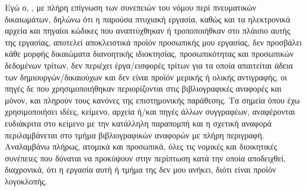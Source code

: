 \documentclass[
11pt, %
english, %
singlespacing, %
headsepline, %
]{MastersDoctoralThesis} %
\begin{document}

\begin{declaration}
\addchaptertocentry{\authorshipname} %
\noindent Εγώ ο, \authorname, με πλήρη επίγνωση των συνεπειών του νόμου περί πνευματικών δικαιωμάτων, δηλώνω ότι η παρούσα πτυχιακή εργασία, καθώς και τα ηλεκτρονικά αρχεία και πηγαίοι κώδικες που αναπτύχθηκαν ή τροποποιήθκαν στο πλάισιο αυτής της εργασίας, αποτελεί αποκλειστικά προϊόν προσωπικής μου εργασίας, δεν προσβάλει κάθε μορφής δικαιώματα διανοητικής ιδιοκτησίας, προσωπικότητας και προσωπικών δεδομένων τρίτων, δεν περιέχει έργα/εισφορές τρίτων για τα οποία απαιτείται άδεια των δημιουργών/δικαιούχων και δεν είναι προϊόν μερικής ή ολικής αντιγραφής, οι πηγές δε που χρησιμοποιήθηκαν περιορίζονται στις βιβλιογραφικές αναφορές και μόνον, και πληρούν τους κανόνες της επιστημονικής παράθεσης. Τα σημεία όπου έχω χρησιμοποιήσει ιδέες, κείμενο, αρχεία ή/και πηγές άλλων συγγραφέων, αναφέρονται ευδιάκριτα στο κείμενο με την κατάλληλη παραπομπή και η σχετική αναφορά περιλαμβάνεται στο τμήμα βιβλιογραφικών αναφορών με πλήρη περιγραφή. Αναλαμβάνω πλήρως, ατομικά και προσωπικά, όλες τις νομικές και διοικητικές συνέπειες που δύναται να προκύψουν στην περίπτωση κατά την οποία αποδειχθεί, διαχρονικά, ότι η εργασία αυτή ή τμήμα της δεν μου ανήκει, διότι είναι προϊόν λογοκλοπής.
\vspace{5cm}

\end{declaration}

\cleardoublepage


\end{document}
